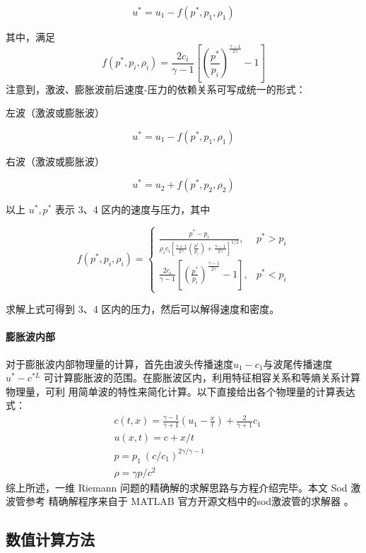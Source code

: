 \documentclass[UTF8]{ctexart}
\begin{document}
$$u^{*}=u_{1}-f(p^{*},p_{1},\rho_{1})$$

其中，满足 
\begin{equation}
f(p^{*},p_{i},\rho_{i})=\frac{2c_{i}}{\gamma-1}\left[\left(\frac{p^{*}}{p_{i}}\right)^{\frac{\gamma-1}{2\gamma}}-1\right]
\end{equation}
注意到，激波、膨胀波前后速度-压力的依赖关系可写成统一的形式：

左波（激波或膨胀波）

$$u^{*}=u_{1}-f(p^{*},p_{1},\rho_{1})$$

右波（激波或膨胀波）

$$u^{*}=u_{2}+f(p^{*},p_{2},\rho_{2})$$

以上 $u^{*},p^{*}$ 表示 3、4 区内的速度与压力，其中

\begin{equation}
f(p^{*},p_{i},\rho_{i})=\left\{\begin{array}{ll}\frac{p^{*}-p_{i}}{\rho_{i}c_{i}\left[\frac{\gamma+1}{2\gamma}\left(\frac{p^{*}}{p_{i}}\right)+\frac{\gamma-1}{2\gamma}\right]^{1/2}}, & p^{*}>p_{i}\\\frac{2c_{i}}{\gamma-1}\left[\left(\frac{p^{*}}{p_{i}}\right)^{\frac{\gamma-1}{2\gamma}}-1\right], & p^{*}<p_{i}\end{array}\right.
\end{equation}

求解上式可得到 3、4 区内的压力，然后可以解得速度和密度。
\paragraph{膨胀波内部}

对于膨胀波内部物理量的计算，首先由波头传播速度$u_1-c_1$与波尾传播速度$u^*-c^{*L}$
可计算膨胀波的范围。在膨胀波区内，利用特征相容关系和等熵关系计算物理量，可利
用简单波的特性来简化计算。以下直接给出各个物理量的计算表达式：
$$\begin{aligned}&c(t,x)=\frac{\gamma-1}{\gamma+1}\left(u_{1}-\frac{x}{t}\right)+\frac{2}{\gamma+1}c_{1}\\&u(x,t)=c+x/t\\&p=p_{1}\:(c/c_{1})^{2\gamma/\gamma-1}\\&\rho=\gamma p/c^{2}\end{aligned}$$
综上所述，一维 Riemann 问题的精确解的求解思路与方程介绍完毕。本文 Sod 激波管参考
精确解程序来自于 MATLAB 官方开源文档中的sod激波管的求解器 \cite{gogol2025}。

\subsection{数值计算方法}
\end{document}
